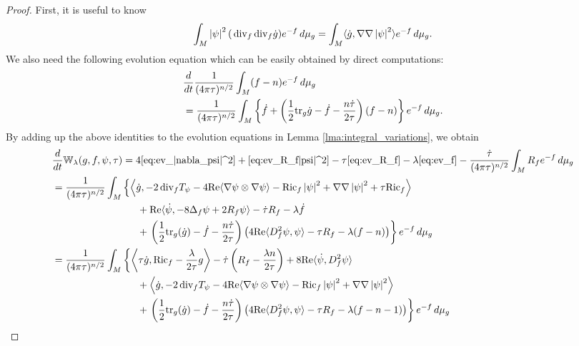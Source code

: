 \documentclass{amsart}
\theoremstyle{definition}
\theoremstyle{remark}
\numberwithin{equation}{section}
\newcommand{\abs}[1]{\left|#1\right|}
\newcommand{\tr}{\textup{tr}}
\newcommand{\Ric}{\textup{Ric}}
\renewcommand{\div}{\,\textup{div}}
\begin{document}
\begin{proof}
First, it is useful to know
\begin{equation}
\int_M \abs{\psi}^2 (\div_f\div_f \dot{g}) e^{-f}\,d\mu_g = \int_M \langle \dot{g},\nabla\nabla\abs{\psi}^2 \rangle e^{-f}\,d\mu_g.
\end{equation}
We also need the following evolution equation which can be easily obtained by direct computations:
\begin{align}
\label{eq:ev_f} & \frac{d}{dt}\frac{1}{(4\pi\tau)^{n/2}}\int_M (f-n)e^{-f}\,d\mu_g\\
& = \frac{1}{(4\pi\tau)^{n/2}}\int_M \left\{\dot{f} + \left(\frac{1}{2}\tr_g \dot{g} - \dot{f} - \frac{n\dot\tau}{2\tau}\right)(f-n)\right\}e^{-f}\,d\mu_g. \nonumber
\end{align}
By adding up the above identities to the evolution equations in Lemma \ref{lma:integral_variations}, we obtain
\begin{align}
\label{eq:var_W_1}
& \frac{d}{dt}\mathbb{W}_\lambda(g,f,\psi,\tau) = 4\eqref{eq:ev_|nabla_psi|^2} + \eqref{eq:ev_R_f|psi|^2} - \tau\eqref{eq:ev_R_f}-\lambda\eqref{eq:ev_f} - \frac{\dot\tau}{(4\pi\tau)^{n/2}}\int_M R_f e^{-f}\,d\mu_g\\
& = \frac{1}{(4\pi\tau)^{n/2}}\int_M \left\{\left\langle \dot{g}, -2\div_f T_\psi -4\textup{Re}\langle\nabla\psi\otimes\nabla\psi\rangle  - \Ric_f \abs{\psi}^2 + \nabla\nabla\abs{\psi}^2 + \tau \Ric_f\right\rangle\right. \nonumber\\
& \hskip 3cm + \textup{Re}\langle \dot\psi, -8\Delta_f \psi+ 2R_f\psi\rangle - \dot\tau R_f - \lambda\dot{f}\nonumber\\
& \hskip 3cm + \left.\left(\frac{1}{2}\tr_g(\dot{g}) - \dot{f} - \frac{n\dot\tau}{2\tau}\right)\left(4\textup{Re}\langle D_f^2\psi,\psi\rangle - \tau R_f - \lambda(f-n)\right)\right\}e^{-f}\,d\mu_g\nonumber\\
& = \frac{1}{(4\pi\tau)^{n/2}} \int_M \left\{\left\langle \tau\dot{g}, \Ric_f - \frac{\lambda}{2\tau}g\right\rangle - \dot\tau \left(R_f - \frac{\lambda n}{2\tau}\right)  + 8\textup{Re} \langle \dot\psi, D_f^2\psi\rangle\right. \nonumber\\
& \hskip 3cm + \left\langle \dot{g}, -2\div_f T_\psi -4\textup{Re}\langle\nabla\psi\otimes\nabla\psi\rangle  - \Ric_f \abs{\psi}^2 + \nabla\nabla\abs{\psi}^2\right\rangle \nonumber\\
& \hskip 3cm + \left.\left(\frac{1}{2}\tr_g(\dot{g}) - \dot{f} - \frac{n\dot\tau}{2\tau}\right)\left(4\textup{Re}\langle D_f^2\psi,\psi\rangle - \tau R_f - \lambda(f-n-1)\right)\right\}e^{-f}\,d\mu_g\nonumber

\end{align}
\end{proof}
\end{document}
